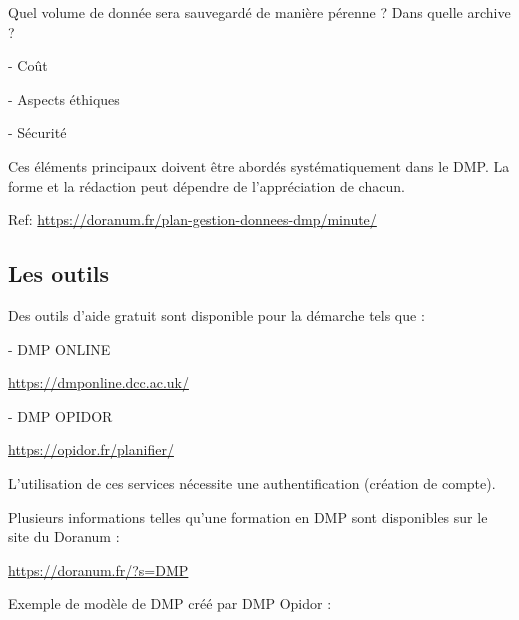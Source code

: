 \documentclass[14pt,oneside]{article}
\begin{document}
\begin{flushleft}
Quel volume de donnée sera sauvegardé de manière pérenne ? Dans quelle archive ?
\end{flushleft}

-	Coût

-	Aspects éthiques

-	Sécurité

\begin{flushleft}
Ces éléments principaux doivent être abordés systématiquement dans le DMP. La forme et la rédaction peut dépendre de l’appréciation de chacun.
\end{flushleft}


\begin{flushleft}
Ref: \url{https://doranum.fr/plan-gestion-donnees-dmp/minute/}
\end{flushleft}

\subsection*{Les outils}

\begin{flushleft}
Des outils d’aide gratuit sont disponible pour la démarche tels que :
\end{flushleft}

-	DMP ONLINE

\begin{flushleft}
\url{https://dmponline.dcc.ac.uk/}
\end{flushleft}

-	DMP OPIDOR

\begin{flushleft}
\url{https://opidor.fr/planifier/}
\end{flushleft}

\begin{flushleft}
L’utilisation de ces services nécessite une authentification (création de compte).
\end{flushleft}

\begin{flushleft}
Plusieurs informations telles qu’une formation en DMP sont disponibles sur le site du Doranum :
\end{flushleft}

\begin{flushleft}
\url{https://doranum.fr/?s=DMP}
\end{flushleft}

\newpage

\begin{flushleft}
Exemple de modèle de DMP créé par DMP Opidor :
\end{flushleft}
\end{document}
